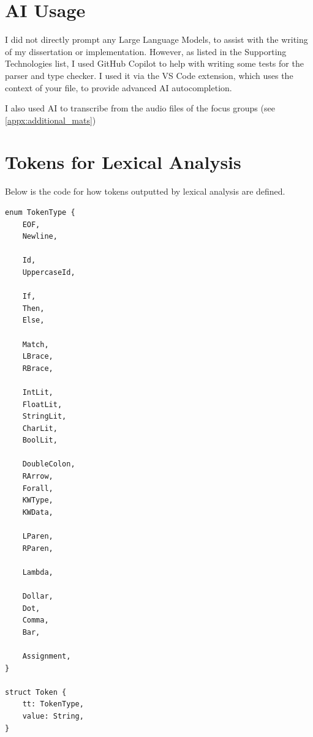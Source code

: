 
\appendix

\chapter{AI Usage}
\label{appx:ai_prompt}

I did not directly prompt any Large Language Models, to assist with the writing of my dissertation or implementation. However, as listed in the Supporting Technologies list, I used GitHub Copilot to help with writing some tests for the parser and type checker. I used it via the VS Code extension, which uses the context of your file, to provide advanced AI autocompletion.

I also used AI to transcribe from the audio files of the focus groups (see \ref{appx:additional_mats})











\chapter{Tokens for Lexical Analysis}
\label{appx:tokens}
Below is the code for how tokens outputted by lexical analysis are defined. 
\begin{lstlisting}
enum TokenType {
    EOF,
    Newline,

    Id,
    UppercaseId,

    If,
    Then,
    Else,

    Match,
    LBrace,
    RBrace,

    IntLit,
    FloatLit,
    StringLit,
    CharLit,
    BoolLit,

    DoubleColon,
    RArrow,
    Forall,
    KWType,
    KWData,

    LParen,
    RParen,

    Lambda,

    Dollar,
    Dot,
    Comma,
    Bar,

    Assignment,
}

struct Token {
    tt: TokenType,
    value: String,
}
\end{lstlisting}

